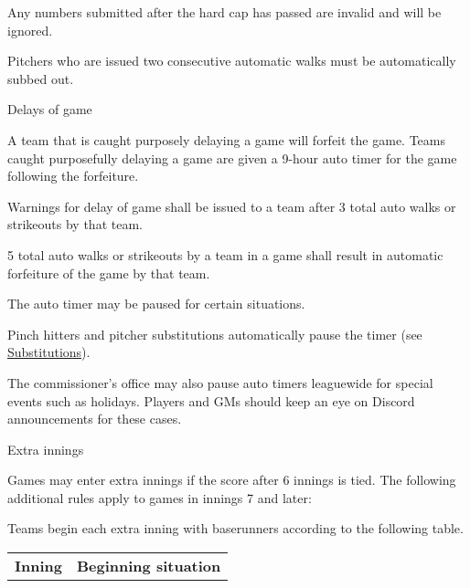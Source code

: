 \begin{deepEnumerate}
\begin{deepEnumerate}
\begin{deepEnumerate}
			\item Any numbers submitted after the hard cap has passed are invalid and will be ignored.
		\end{deepEnumerate}
		\item Pitchers who are issued two consecutive automatic walks must be automatically subbed out.
		\item Delays of game
		\begin{deepEnumerate}
			\item A team that is caught purposely delaying a game will forfeit the game. 
			Teams caught purposefully delaying a game are given a 9-hour auto timer for the game following the forfeiture.
			\item Warnings for delay of game shall be issued to a team after 3 total auto walks or strikeouts by that team.
			\item 5 total auto walks or strikeouts by a team in a game shall result in automatic forfeiture of the game by that team.
		\end{deepEnumerate}
		\item The auto timer may be paused for certain situations.
		\begin{deepEnumerate}
			\item Pinch hitters and pitcher substitutions automatically pause the timer (see \hyperref[sec:substitutions]{Substitutions}).
			\item The commissioner’s office may also pause auto timers leaguewide for special events such as holidays. 
			Players and GMs should keep an eye on Discord announcements for these cases.
		\end{deepEnumerate}
	\end{deepEnumerate}
	\item Extra innings
	\label{sec:extra innings}
	\begin{deepEnumerate}
		\item Games may enter extra innings if the score after 6 innings is tied. 
		The following additional rules apply to games in innings 7 and later:
		\begin{deepEnumerate}
			\item Teams begin each extra inning with baserunners according to the following table.
			\begin{center}										                
				\begin{longtable}{|p{3cm}|p{8cm}|}
					\hline
					\textbf{Inning} & \textbf{Beginning situation}                                          \\

\end{longtable}
\end{center}
\end{deepEnumerate}
\end{deepEnumerate}
\end{deepEnumerate}
